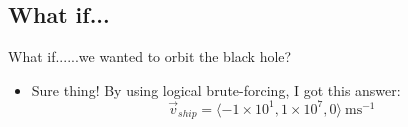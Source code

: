 





\subsection{What if...}
\begin{frame}{What if...}{...we wanted to orbit the black hole?}
\begin{itemize}
    \item Sure thing! By using logical brute-forcing, I got this answer:
        \[ \vec{v}_{ship} = \langle -1 \times 10^1, 1 \times 10^7, 0 \rangle\ \mathrm{ms^{-1}} \]
\end{itemize}
\end{frame}